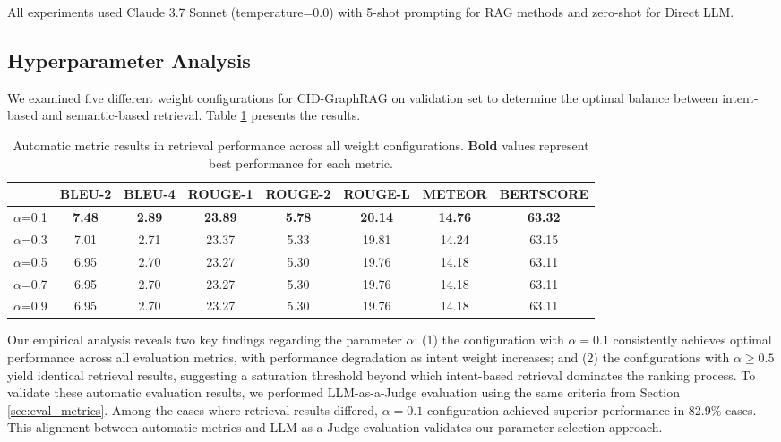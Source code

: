 \documentclass[
]{style/ceurart}
\begin{document}
All experiments used Claude 3.7 Sonnet (temperature=0.0) with 5-shot prompting for RAG methods and zero-shot for Direct LLM.

\subsection {Hyperparameter Analysis} 
We examined five different weight configurations for CID-GraphRAG on validation set to determine the optimal balance between intent-based and semantic-based retrieval. Table \ref{tab:weight_configs} presents the results.

\begin{table}[t]
\caption{Automatic metric results in retrieval performance across all weight configurations. \textbf{Bold} values represent best performance for each metric.}
\label{tab:weight_configs}
\small
\centering
\renewcommand{\arraystretch}{1.2}
\begin{tabular}{lccccccc}
\hline
 &
\textbf{BLEU-2} &
\textbf{BLEU-4} &
\textbf{ROUGE-1} &
\textbf{ROUGE-2} &
\textbf{ROUGE-L} &
\textbf{METEOR} &
\textbf{BERTSCORE} \\ 
\hline
$\alpha$=0.1 &
\textbf{7.48} &
\textbf{2.89} &
\textbf{23.89} &
\textbf{5.78} &
\textbf{20.14} &
\textbf{14.76} &
\textbf{63.32} \\
$\alpha$=0.3 &
7.01 &
2.71 &
23.37 &
5.33 &
19.81 &
14.24 &
63.15 \\
$\alpha$=0.5 &
6.95 &
2.70 &
23.27 &
5.30 &
19.76 &
14.18 &
63.11 \\
$\alpha$=0.7 &
6.95 &
2.70 &
23.27 &
5.30 &
19.76 &
14.18 &
63.11 \\
$\alpha$=0.9 &
6.95 &
2.70 &
23.27 &
5.30 &
19.76 &
14.18 &
63.11 \\ 
\hline
\end{tabular}
\end{table}

Our empirical analysis reveals two key findings regarding the parameter $\alpha$: (1) the configuration with $\alpha=0.1$ consistently achieves optimal performance across all evaluation metrics, with performance degradation as intent weight increases; and (2) the configurations with $\alpha \geq 0.5$ yield identical retrieval results, suggesting a saturation threshold beyond which intent-based retrieval dominates the ranking process. To validate these automatic evaluation results, we performed LLM-as-a-Judge evaluation using the same criteria from Section \ref{sec:eval_metrics}. Among the cases where retrieval results differed, $\alpha=0.1$ configuration achieved superior performance in 82.9\% cases. This alignment between automatic metrics and LLM-as-a-Judge evaluation validates our parameter selection approach.
\end{document}
